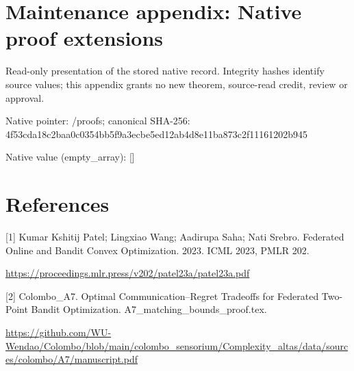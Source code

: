 \documentclass[10pt,a4paper]{article}
\begin{document}
\section{Maintenance appendix: Native proof extensions}


Read-only presentation of the stored native record. Integrity hashes identify source values; this appendix grants no new theorem, source-read credit, review or approval.



Native pointer: /proofs; canonical SHA-256: 4f53cda18c2baa0c0354bb5f\allowbreak{}9a3ecbe5ed12ab4d8e11ba87\allowbreak{}3c2f11161202b945



Native value (empty\_array): []



\section{References}


[1] Kumar Kshitij Patel; Lingxiao Wang; Aadirupa Saha; Nati Srebro. Federated Online and Bandit Convex Optimization. 2023. ICML 2023, PMLR 202.



\url{https://proceedings.mlr.press/v202/patel23a/patel23a.pdf}



[2] Colombo\_A7. Optimal Communication--Regret Tradeoffs for Federated Two-Point Bandit Optimization. A7\_matching\_bounds\_proof.tex.



\url{https://github.com/WU-Wendao/Colombo/blob/main/colombo_sensorium/Complexity_altas/data/sources/colombo/A7/manuscript.pdf}
\end{document}
